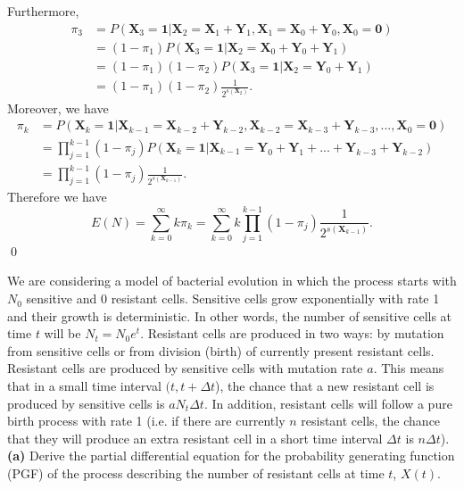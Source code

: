 \documentclass[10pt]{amsart}
\begin{document}
\noindent
Furthermore, 
\begin{align*}
\pi_3 &= P(\bm X_3 = \bm 1| \bm X_2 = \bm X_1 + \bm Y_1, \bm X_1 = \bm X_0 + \bm Y_0, \bm X_0 = \bm 0) \\
	&= (1 - \pi_1)P(\bm X_3 = \bm 1| \bm X_2 = \bm X_0 + \bm Y_0 + \bm Y_1) \\
	&= (1 - \pi_1)(1 - \pi_2)P(\bm X_3 = \bm 1| \bm X_2 = \bm Y_0 + \bm Y_1) \\
	&= (1 - \pi_1)(1 - \pi_2)\frac 1 {2^{s(\bm X_2)}}.
\end{align*}
Moreover, we have
\begin{align*}
\pi_k &= P(\bm X_k = \bm 1 | \bm X_{k - 1} = \bm X_{k - 2} + \bm Y_{k - 2}, \bm X_{k - 2} = \bm X_{k - 3} + \bm Y_{k - 3}, ..., \bm X_0 = \bm 0 ) \\
	&= \prod_{j=1}^{k-1} (1 - \pi_j) P(\bm X_k = \bm 1 | \bm X_{k - 1} = \bm Y_0 + \bm Y_1 + ... + \bm Y_{k - 3} + \bm Y_{k - 2}) \\
	&= \prod_{j=1}^{k-1} (1 - \pi_j) \frac 1 {2^{s(\bm X_{k-1})}}.
\end{align*}
Therefore we have
$$
E (N) = \sum_{k=0}^\infty k \pi_k = \sum_{k=0}^\infty k \prod_{j=1}^{k-1} (1 - \pi_j) \frac 1 {2^{s(\bm X_{k-1})}}.
$$
\qed \\
\newpage


 We are considering a model of bacterial evolution in which the process starts with $N_0$ sensitive and 0 resistant cells. Sensitive cells grow exponentially with rate 1 and their growth is deterministic. In other words, the number of sensitive cells at time $t$ will be $N_t=N_0 e^t$. Resistant cells are produced in two ways:  by mutation from sensitive cells or from division (birth) of currently present resistant cells. Resistant cells are produced by sensitive cells with mutation rate $a$. This means that in a small time interval $(t,t+\Delta t$), the chance that a new resistant cell is produced by sensitive cells is $a N_t \Delta t$. In addition, resistant cells will follow a pure birth process with rate 1 (i.e. if there are currently $n$ resistant cells, the chance that they will produce an extra resistant cell in a short time interval $\Delta t$ is $n\Delta t$). 
\\

\noindent
{\bf (a)} Derive the partial differential equation for the probability generating function (PGF) of the process describing the number of resistant cells at time $t$, $X(t)$.\\
\end{document}
